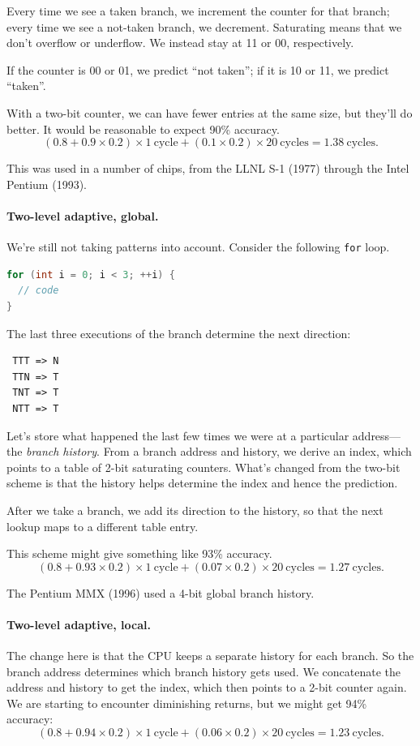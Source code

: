 \documentclass[a4paper]{report}
\begin{document}
Every time we see a taken branch, we increment the counter for that
branch; every time we see a not-taken branch, we decrement. Saturating
means that we don't overflow or underflow. We instead stay at 11 or
00, respectively.

If the counter is 00 or 01, we predict ``not taken''; if it is 10 or
11, we predict ``taken''.

With a two-bit counter, we can have fewer entries at the same size, but they'll do better.
It would be reasonable to expect 90\% accuracy.
\[
(0.8 + 0.9 \times 0.2) \times 1 \mathrm{~cycle} + (0.1 \times 0.2) \times 20 \mathrm{~cycles} = 1.38 \mathrm{~cycles}.
\]

This was used in a number of chips, from the LLNL S-1 (1977) through the Intel Pentium (1993).

\paragraph{Two-level adaptive, global.}
We're still not taking patterns into account. Consider the following {\tt for} loop.
\begin{lstlisting}[language=C]
for (int i = 0; i < 3; ++i) {
  // code
}
\end{lstlisting}
The last three executions of the branch determine the next direction:
\begin{verbatim}
 TTT => N
 TTN => T
 TNT => T
 NTT => T
\end{verbatim}
Let's store what happened the last few times we were at a particular address---the
\emph{branch history}. From a branch address and history, we derive an index, which
points to a table of 2-bit saturating counters. What's changed from the two-bit scheme
is that the history helps determine the index and hence the prediction.

After we take a branch, we add its direction to the history, so that the next lookup
maps to a different table entry.

This scheme might give something like 93\% accuracy.
\[
(0.8 + 0.93 \times 0.2) \times 1 \mathrm{~cycle} + (0.07 \times 0.2) \times 20 \mathrm{~cycles} = 1.27 \mathrm{~cycles}.
\]

The Pentium MMX (1996) used a 4-bit global branch history.

\paragraph{Two-level adaptive, local.}
The change here is that the CPU keeps a separate history for each branch.
So the branch address determines which branch history gets used.
We concatenate the address and history to get the index, which then points to a
2-bit counter again. We are starting to encounter diminishing returns, but we might
get 94\% accuracy:
\[
(0.8 + 0.94 \times 0.2) \times 1 \mathrm{~cycle} + (0.06 \times 0.2) \times 20 \mathrm{~cycles} = 1.23 \mathrm{~cycles}.
\]
\end{document}
